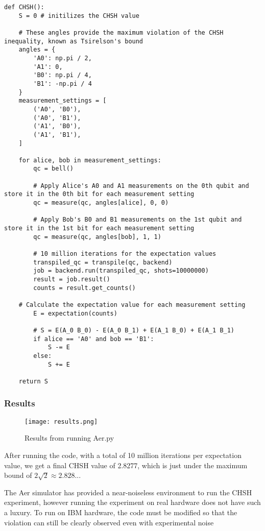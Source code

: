 \documentclass[12pt]{article}
\begin{document}
\begin{lstlisting}[style=python]
def CHSH():
    S = 0 # initilizes the CHSH value

    # These angles provide the maximum violation of the CHSH inequality, known as Tsirelson's bound
    angles = {
        'A0': np.pi / 2,   
        'A1': 0,            
        'B0': np.pi / 4,   
        'B1': -np.pi / 4
    }
    measurement_settings = [
        ('A0', 'B0'),    
        ('A0', 'B1'),
        ('A1', 'B0'),
        ('A1', 'B1'),
    ]

    for alice, bob in measurement_settings:
        qc = bell()
        
        # Apply Alice's A0 and A1 measurements on the 0th qubit and store it in the 0th bit for each measurement setting
        qc = measure(qc, angles[alice], 0, 0)
        
        # Apply Bob's B0 and B1 measurements on the 1st qubit and store it in the 1st bit for each measurement setting
        qc = measure(qc, angles[bob], 1, 1)

        # 10 million iterations for the expectation values
        transpiled_qc = transpile(qc, backend)
        job = backend.run(transpiled_qc, shots=10000000) 
        result = job.result()
        counts = result.get_counts()
        
    # Calculate the expectation value for each measurement setting
        E = expectation(counts)

        # S = E(A_0 B_0) - E(A_0 B_1) + E(A_1 B_0) + E(A_1 B_1)
        if alice == 'A0' and bob == 'B1':  
            S -= E 
        else:  
            S += E

    return S
\end{lstlisting}

\subsubsection{Results}


\begin{figure}[h]
    \centering
    \texttt{[image: results.png]}
    \caption{Results from running Aer.py}
    \label{fig:results}
\end{figure}

After running the code, with a total of 10 million iterations per expectation value, we get a final CHSH value of 2.8277, which is just under the maximum bound of $2\sqrt{2} \approx 2.828...$

The Aer simulator has provided a near-noiseless environment to run the CHSH experiment, however running the experiment on real hardware does not have such a luxury. To run on IBM hardware, the code must be modified so that the violation can still be clearly observed even with experimental noise 
\end{document}
